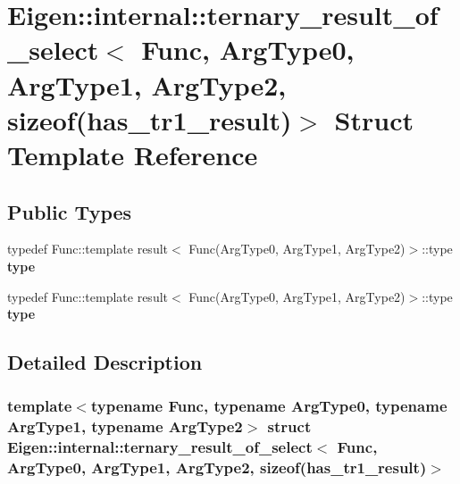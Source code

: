 \hypertarget{struct_eigen_1_1internal_1_1ternary__result__of__select_3_01_func_00_01_arg_type0_00_01_arg_type6eb986b9b1e9aafbcbfee4e37d87eaa7}{}\section{Eigen\+:\+:internal\+:\+:ternary\+\_\+result\+\_\+of\+\_\+select$<$ Func, Arg\+Type0, Arg\+Type1, Arg\+Type2, sizeof(has\+\_\+tr1\+\_\+result)$>$ Struct Template Reference}
\label{struct_eigen_1_1internal_1_1ternary__result__of__select_3_01_func_00_01_arg_type0_00_01_arg_type6eb986b9b1e9aafbcbfee4e37d87eaa7}
\subsection*{Public Types}
\begin{DoxyCompactItemize}
\item 
\mbox{\label{struct_eigen_1_1internal_1_1ternary__result__of__select_3_01_func_00_01_arg_type0_00_01_arg_type6eb986b9b1e9aafbcbfee4e37d87eaa7_a3b81279a562ae75971e073e472e0ff26}} 
typedef Func\+::template result$<$ Func(Arg\+Type0, Arg\+Type1, Arg\+Type2)$>$\+::type {\bfseries type}
\item 
\mbox{\label{struct_eigen_1_1internal_1_1ternary__result__of__select_3_01_func_00_01_arg_type0_00_01_arg_type6eb986b9b1e9aafbcbfee4e37d87eaa7_a3b81279a562ae75971e073e472e0ff26}} 
typedef Func\+::template result$<$ Func(Arg\+Type0, Arg\+Type1, Arg\+Type2)$>$\+::type {\bfseries type}
\end{DoxyCompactItemize}


\subsection{Detailed Description}
\subsubsection*{template$<$typename Func, typename Arg\+Type0, typename Arg\+Type1, typename Arg\+Type2$>$\newline
struct Eigen\+::internal\+::ternary\+\_\+result\+\_\+of\+\_\+select$<$ Func, Arg\+Type0, Arg\+Type1, Arg\+Type2, sizeof(has\+\_\+tr1\+\_\+result)$>$}



